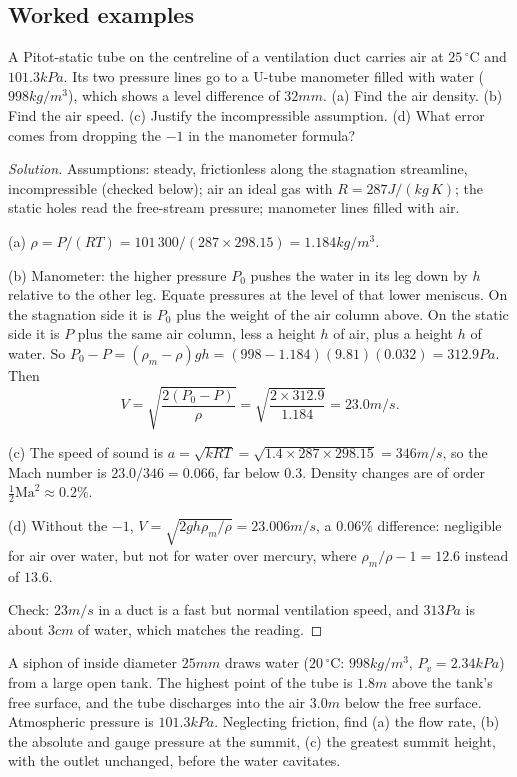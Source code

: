 \subsection*{Worked examples}

\begin{example}
A Pitot-static tube on the centreline of a ventilation duct carries air at $25\,^\circ$C and $101.3\unit{kPa}$. Its two pressure lines go to a U-tube manometer filled with water ($998\unit{kg/m^3}$), which shows a level difference of $32\unit{mm}$. (a) Find the air density. (b) Find the air speed. (c) Justify the incompressible assumption. (d) What error comes from dropping the $-1$ in the manometer formula?
\end{example}

\begin{proof}[Solution]
Assumptions: steady, frictionless along the stagnation streamline, incompressible (checked below); air an ideal gas with $R = 287\unit{J/(kg\,K)}$; the static holes read the free-stream pressure; manometer lines filled with air.

(a) $\rho = P/(RT) = 101\,300/(287\times298.15) = 1.184\unit{kg/m^3}$.

(b) Manometer: the higher pressure $P_0$ pushes the water in its leg down by $h$ relative to the other leg. Equate pressures at the level of that lower meniscus. On the stagnation side it is $P_0$ plus the weight of the air column above. On the static side it is $P$ plus the same air column, less a height $h$ of air, plus a height $h$ of water. So $P_0 - P = (\rho_m - \rho)gh = (998 - 1.184)(9.81)(0.032) = 312.9\unit{Pa}$. Then
\[
V = \sqrt{\frac{2(P_0 - P)}{\rho}} = \sqrt{\frac{2\times312.9}{1.184}} = 23.0\unit{m/s}.
\]

(c) The speed of sound is $a = \sqrt{kRT} = \sqrt{1.4\times287\times298.15} = 346\unit{m/s}$, so the Mach number is $23.0/346 = 0.066$, far below $0.3$. Density changes are of order $\tfrac12\mathrm{Ma}^2 \approx 0.2\%$.

(d) Without the $-1$, $V = \sqrt{2gh\rho_m/\rho} = 23.006\unit{m/s}$, a $0.06\%$ difference: negligible for air over water, but not for water over mercury, where $\rho_m/\rho - 1 = 12.6$ instead of $13.6$.

Check: $23\unit{m/s}$ in a duct is a fast but normal ventilation speed, and $313\unit{Pa}$ is about $3\unit{cm}$ of water, which matches the reading.
\end{proof}

\begin{example}
A siphon of inside diameter $25\unit{mm}$ draws water ($20\,^\circ$C: $998\unit{kg/m^3}$, $P_v = 2.34\unit{kPa}$) from a large open tank. The highest point of the tube is $1.8\unit{m}$ above the tank's free surface, and the tube discharges into the air $3.0\unit{m}$ below the free surface. Atmospheric pressure is $101.3\unit{kPa}$. Neglecting friction, find (a) the flow rate, (b) the absolute and gauge pressure at the summit, (c) the greatest summit height, with the outlet unchanged, before the water cavitates.
\end{example}


